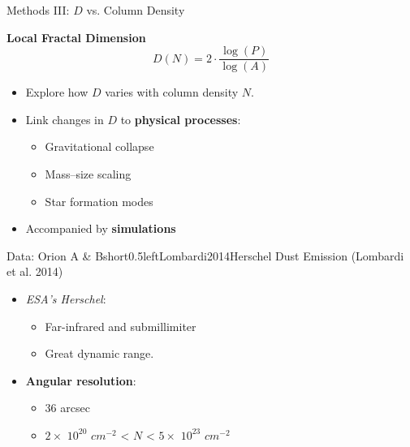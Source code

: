 \documentclass[hyperref={pdfpagelabels=false}, aspectratio=169, t]{beamer}  %
\begin{document}
\begin{textFrame}{Methods III: \( D \) vs. Column Density}{}{}

	\textbf{Local Fractal Dimension}
	\begin{equation}
		D(N) = 2 \cdot \frac{\log(P)}{\log(A)}
	\end{equation}
		
	\begin{itemize}
		\item Explore how \( D \) varies with column density \( N \).
		\item Link changes in \( D \) to \textbf{physical processes}:
		\begin{itemize}
			\item Gravitational collapse  
			\item Mass–size scaling  
			\item Star formation modes
		\end{itemize}
		\item Accompanied by \textbf{simulations}
	\end{itemize}

\end{textFrame}

\begin{graphicsFrame}{Data: Orion A \& B}{short}{0.5}{left}{Lombardi2014}{Herschel Dust Emission (Lombardi et al. 2014)}
\begin{itemize}
    \item \textit{ESA's Herschel}: 
	\begin{itemize}
		\item Far-infrared and submillimiter
		\item Great dynamic range.
	\end{itemize}
    \item \textbf{Angular resolution}: 
	\begin{itemize}
		\item 36 arcsec
		\item $ 2 \times$ $10^{20}$ $cm^{-2}$ < $N$ < $5 \times$ $10^{23}$ $cm^{-2}$
	\end{itemize} 
\end{itemize}
\end{graphicsFrame}
\end{document}
